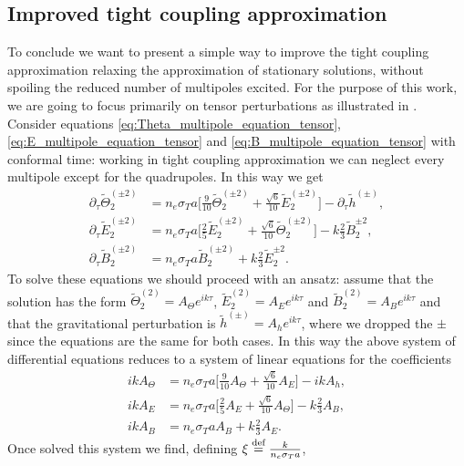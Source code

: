 \subsection{Improved tight coupling approximation}
\label{sec:IMPROVED_TightCouplingApproximation}
To conclude we want to present a simple way to improve the tight coupling approximation relaxing the approximation of stationary solutions, without spoiling the reduced number of multipoles excited. For the purpose of this work, we are going to focus primarily on tensor perturbations as illustrated in \cite{Chluba_tens_diss}.
Consider equations \eqref{eq:Theta_multipole_equation_tensor}, \eqref{eq:E_multipole_equation_tensor} and \eqref{eq:B_multipole_equation_tensor} with conformal time: working in tight coupling approximation we can neglect every multipole except for the quadrupoles. In this way we get
\begin{align*}
    \partial_{\tau}\tilde\Theta_{2}^{(\pm2)}&=n_e\sigma_T a\bigg[\frac{9}{10} \tilde\Theta_{2}^{(\pm2)}+\frac{\sqrt{6}}{10}\tilde E_{2}^{(\pm2)}\bigg]-\partial_{\tau}\tilde h^{(\pm)},\\
    \partial_{\tau}\tilde E_{2}^{(\pm2)}&=n_e\sigma_T a\bigg[\frac{2}{5} \tilde E_{2}^{(\pm2)}+\frac{\sqrt{6}}{10}\tilde \Theta_{2}^{(\pm2)}\bigg]-k\frac{2}{3}\tilde B_2^{\pm2},\\
    \partial_{\tau}\tilde B_{2}^{(\pm2)}&=n_e\sigma_T a\tilde B_{2}^{(\pm2)}+k\frac{2}{3}\tilde E_2^{\pm2}.
\end{align*}
To solve these equations we should proceed with an ansatz: assume that the solution has the form $ \tilde\Theta_{2}^{(2)}=A_\Theta e^{ik\tau}$, $\tilde E_{2}^{(2)}=A_E e^{ik\tau}$ and $\tilde B_{2}^{(2)}=A_B e^{ik\tau}$ and that the gravitational perturbation is $\tilde h^{(\pm)}=A_he^{ik\tau}$, where we dropped the $\pm$ since the equations are the same for both cases. In this way the above system of differential equations reduces to a system of linear equations for the coefficients
\begin{align*}
    ikA_\Theta&=n_e\sigma_T a\bigg[\frac{9}{10} A_\Theta+\frac{\sqrt{6}}{10}A_E\bigg]-ik A_h,\\
    ikA_E&=n_e\sigma_T a\bigg[\frac{2}{5} A_E+\frac{\sqrt{6}}{10}A_\Theta\bigg]-k\frac{2}{3}A_B,\\
    ikA_B&=n_e\sigma_T a A_B+k\frac{2}{3}A_E.
\end{align*}
Once solved this system we find, defining $\xi\stackrel{\text{def}}{=}\frac{k}{n_e\sigma_T a}$,
